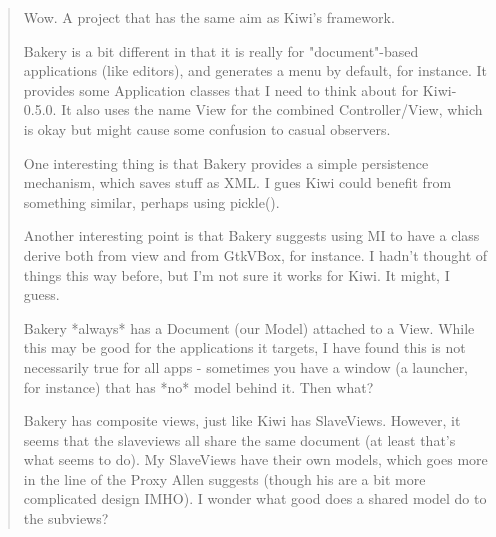 \documentclass[a4paper]{howto}
\begin{document}
\begin{quotation}

    Wow. A project that has the same aim as Kiwi's framework.

    Bakery is a bit different in that it is really for "document"-based
    applications (like editors), and generates a menu by default, for
    instance. It provides some Application classes that I need to think
    about for Kiwi-0.5.0. It also uses the name View for the combined
    Controller/View, which is okay but might cause some confusion to
    casual observers.

    One interesting thing is that Bakery provides a simple persistence
    mechanism, which saves stuff as XML. I gues Kiwi could benefit
    from something similar, perhaps using pickle().

    Another interesting point is that Bakery suggests using MI to have a
    class derive both from view and from GtkVBox, for instance. I hadn't
    thought of things this way before, but I'm not sure it works for
    Kiwi. It might, I guess.

    Bakery *always* has a Document (our Model) attached to a View. While
    this may be good for the applications it targets, I have found this
    is not necessarily true for all apps - sometimes you have a window
    (a launcher, for instance) that has *no* model behind it. Then what?

    Bakery has composite views, just like Kiwi has SlaveViews. However,
    it seems that the slaveviews all share the same document (at least
    that's what  seems to do). My
    SlaveViews have their own models, which goes more in the line of the
    Proxy Allen suggests (though his are a bit more complicated design
    IMHO). I wonder what good does a shared model do to the subviews?

\end{quotation}
\end{document}
